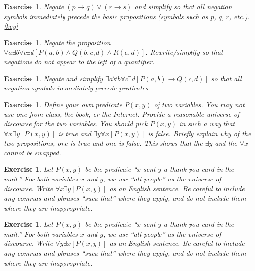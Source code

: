 \documentclass{book}
\newcounter{ekcounter}%
\theoremstyle{ekimcustom}
\newtheorem{exercise}[ekcounter]{Exercise}
\begin{document}
\begin{exercise}
Negate $(p \rightarrow q) \vee (r \rightarrow s)$ and simplify so that all negation symbols immediately precede the basic propositions (symbols such as $p$, $q$, $r$, etc.).\quad\quad\href{https://www.sharelatex.com/project/59becf68c3ef170ecbecf8ab}{{\color{red}[key]}}
\end{exercise}

\begin{exercise}
Negate the proposition $\forall a \exists b \forall c \exists d [ P(a,b) \wedge Q(b,c,d) \wedge R(a,d)]$. Rewrite/simplify so that negations do not appear to the left of a quantifier.
\end{exercise}

\begin{exercise}
Negate and simplify $\exists a \forall b \forall c \exists d [ P(a,b) \rightarrow Q(c,d)]$ so that all negation symbols immediately precede predicates.
\end{exercise}

\begin{exercise}
Define your own predicate $P(x,y)$ of two variables. You may not use one from class, the book, or the Internet. Provide a reasonable universe of discourse for the two variables. You should pick $P(x,y)$ in such a way that $\forall x \exists y [P(x,y)]$ is true and $\exists y \forall x[P(x,y)]$ is false. Briefly explain why of the two propositions, one is true and one is false. This shows that the $\exists y$ and the $\forall x$ cannot be swapped.
\end{exercise}

\begin{exercise}
Let $P(x,y)$ be the predicate ``$x$ sent $y$ a thank you card in the mail.'' For both variables $x$ and $y$, we use ``all people'' as the universe of discourse. Write $\forall x \exists y [P(x,y)]$ as an English sentence. Be careful to include any commas and phrases ``such that'' where they apply, and do not include them where they are inappropriate.
\end{exercise}

\begin{exercise}
Let $P(x,y)$ be the predicate ``$x$ sent $y$ a thank you card in the mail.'' For both variables $x$ and $y$, we use ``all people'' as the universe of discourse. Write $\forall y \exists x [P(x,y)]$ as an English sentence. Be careful to include any commas and phrases ``such that'' where they apply, and do not include them where they are inappropriate.
\end{exercise}
\end{document}

